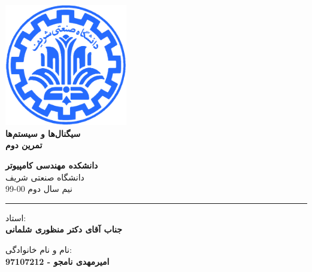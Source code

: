 \documentclass[12pt]{article}
\begin{document}
\begin{titlepage}
\begin{center}
        
\vspace*{0.7cm}

\includegraphics[width=0.4\textwidth]{sharif1.png}\\
\vspace{0.5cm}
\textbf{ \Huge{\emph ‌سیگنال‌ها و سیستم‌ها} }\\
\vspace{0.5cm}
\textbf{ \Large{ تمرین دوم} }
\vspace{0.2cm}
       
 
      \large \textbf{دانشکده مهندسی کامپیوتر}\\\vspace{0.2cm}
    \large   دانشگاه صنعتی شریف\\\vspace{0.2cm}
       \large   ﻧﯿﻢ سال دوم 00-99 \\\vspace{0.2cm}
      \noindent\rule[1ex]{\linewidth}{1pt}
استاد:\\
    \textbf{{جناب آقای دکتر منظوری شلمانی}}


    \vspace{0.15cm}
نام و نام خانوادگی:\\

       
    \textbf{{امیرمهدی نامجو - 97107212}}
\end{center}
\end{titlepage}


\newpage
\pagestyle{fancy}
\fancyhf{}
\fancyfoot{}
\cfoot{\thepage}
\end{document}
